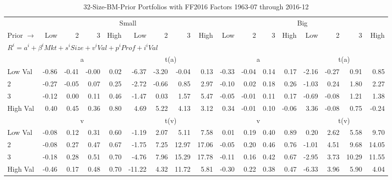 
\begin{table}[!ht]
\centering
\caption{32-Size-BM-Prior Portfolios with FF2016 Factors 1963-07 through 2016-12}
\begin{tabular}{lrrrrrrrrrrrrrrrr}
  \toprule
    & \multicolumn{8}{c}{Small} & \multicolumn{8}{c}{Big} \\
      \cmidrule(r){2-9} \cmidrule(r){10-17}
    Prior $\rightarrow$ & Low & 2 & 3 & High & Low & 2 & 3 & High & Low & 2 & 3 & High & Low & 2 & 3 & High \\ 
  \midrule
  \multicolumn{17}{l}{$R^i=a^i+\beta^iMkt+s^iSize+v^iVal+p^iProf+i^iVal$} \\

  
    
      & \multicolumn{4}{c}{a} & \multicolumn{4}{c}{t(a)}
    
      & \multicolumn{4}{c}{a} & \multicolumn{4}{c}{t(a)}
    
    \\
      \cmidrule(r){2-5} \cmidrule(r){6-9} \cmidrule(r){10-13} \cmidrule(r){14-17}

    Low Val   & -0.86  & -0.41  & -0.00  & 0.02  & -6.37  & -3.20  & -0.04  & 0.13  & -0.33  & -0.04  & 0.14  & 0.17  & -2.16  & -0.27  & 0.91  & 0.85  \\
           2  & -0.27  & -0.05  & 0.07  & 0.25  & -2.72  & -0.66  & 0.85  & 2.97  & -0.10  & 0.02  & 0.18  & 0.26  & -1.03  & 0.24  & 1.80  & 2.27  \\
           3  & -0.12  & 0.00  & 0.11  & 0.46  & -1.47  & 0.03  & 1.57  & 5.47  & -0.05  & -0.01  & 0.11  & 0.17  & -0.69  & -0.08  & 1.21  & 1.38  \\
    High Val  & 0.40  & 0.45  & 0.36  & 0.80  & 4.69  & 5.22  & 4.13  & 3.12  & 0.34  & -0.01  & 0.10  & -0.06  & 3.36  & -0.08  & 0.75  & -0.24  \\

  
    
      & \multicolumn{4}{c}{v} & \multicolumn{4}{c}{t(v)}
    
      & \multicolumn{4}{c}{v} & \multicolumn{4}{c}{t(v)}
    
    \\
      \cmidrule(r){2-5} \cmidrule(r){6-9} \cmidrule(r){10-13} \cmidrule(r){14-17}

    Low Val   & -0.08  & 0.12  & 0.31  & 0.60  & -1.19  & 2.07  & 5.11  & 7.58  & 0.01  & 0.19  & 0.40  & 0.89  & 0.20  & 2.62  & 5.58  & 9.70  \\
           2  & -0.08  & 0.27  & 0.47  & 0.67  & -1.75  & 7.25  & 12.97  & 17.06  & -0.05  & 0.20  & 0.46  & 0.76  & -1.01  & 4.51  & 9.68  & 14.05  \\
           3  & -0.18  & 0.28  & 0.51  & 0.70  & -4.76  & 7.96  & 15.29  & 17.78  & -0.11  & 0.16  & 0.42  & 0.67  & -2.95  & 3.73  & 10.29  & 11.55  \\
    High Val  & -0.46  & 0.17  & 0.48  & 0.70  & -11.22  & 4.32  & 11.72  & 5.81  & -0.30  & 0.22  & 0.38  & 0.47  & -6.33  & 3.96  & 5.90  & 4.04  \\


\end{tabular}
\end{table}
